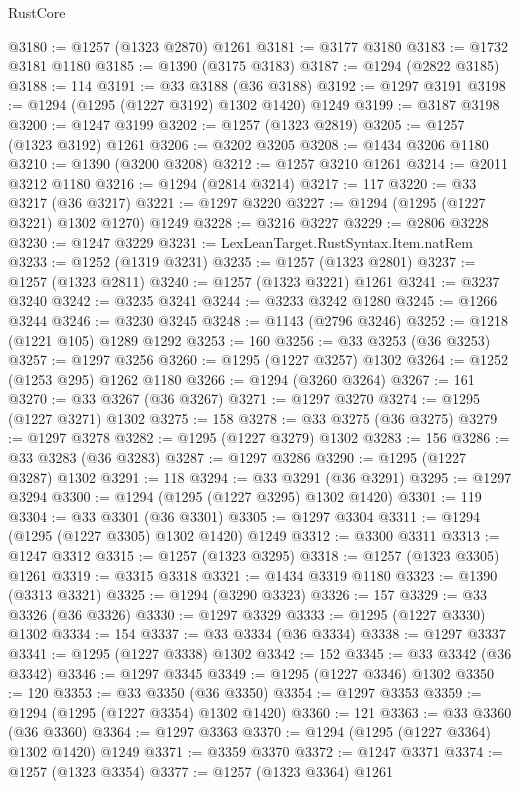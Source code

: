 \begin{lexlean}{RustCore}
\begin{coremodule}
@3180 := @1257 (@1323 @2870) @1261
@3181 := @3177 @3180
@3183 := @1732 @3181 @1180
@3185 := @1390 (@3175 @3183)
@3187 := @1294 (@2822 @3185)
@3188 := 114
@3191 := @33 @3188 (@36 @3188)
@3192 := @1297 @3191
@3198 := @1294 (@1295 (@1227 @3192) @1302 @1420) @1249
@3199 := @3187 @3198
@3200 := @1247 @3199
@3202 := @1257 (@1323 @2819)
@3205 := @1257 (@1323 @3192) @1261
@3206 := @3202 @3205
@3208 := @1434 @3206 @1180
@3210 := @1390 (@3200 @3208)
@3212 := @1257 @3210 @1261
@3214 := @2011 @3212 @1180
@3216 := @1294 (@2814 @3214)
@3217 := 117
@3220 := @33 @3217 (@36 @3217)
@3221 := @1297 @3220
@3227 := @1294 (@1295 (@1227 @3221) @1302 @1270) @1249
@3228 := @3216 @3227
@3229 := @2806 @3228
@3230 := @1247 @3229
@3231 := LexLeanTarget.RustSyntax.Item.natRem
@3233 := @1252 (@1319 @3231)
@3235 := @1257 (@1323 @2801)
@3237 := @1257 (@1323 @2811)
@3240 := @1257 (@1323 @3221) @1261
@3241 := @3237 @3240
@3242 := @3235 @3241
@3244 := @3233 @3242 @1280
@3245 := @1266 @3244
@3246 := @3230 @3245
@3248 := @1143 (@2796 @3246)
@3252 := @1218 (@1221 @105) @1289 @1292
@3253 := 160
@3256 := @33 @3253 (@36 @3253)
@3257 := @1297 @3256
@3260 := @1295 (@1227 @3257) @1302
@3264 := @1252 (@1253 @295) @1262 @1180
@3266 := @1294 (@3260 @3264)
@3267 := 161
@3270 := @33 @3267 (@36 @3267)
@3271 := @1297 @3270
@3274 := @1295 (@1227 @3271) @1302
@3275 := 158
@3278 := @33 @3275 (@36 @3275)
@3279 := @1297 @3278
@3282 := @1295 (@1227 @3279) @1302
@3283 := 156
@3286 := @33 @3283 (@36 @3283)
@3287 := @1297 @3286
@3290 := @1295 (@1227 @3287) @1302
@3291 := 118
@3294 := @33 @3291 (@36 @3291)
@3295 := @1297 @3294
@3300 := @1294 (@1295 (@1227 @3295) @1302 @1420)
@3301 := 119
@3304 := @33 @3301 (@36 @3301)
@3305 := @1297 @3304
@3311 := @1294 (@1295 (@1227 @3305) @1302 @1420) @1249
@3312 := @3300 @3311
@3313 := @1247 @3312
@3315 := @1257 (@1323 @3295)
@3318 := @1257 (@1323 @3305) @1261
@3319 := @3315 @3318
@3321 := @1434 @3319 @1180
@3323 := @1390 (@3313 @3321)
@3325 := @1294 (@3290 @3323)
@3326 := 157
@3329 := @33 @3326 (@36 @3326)
@3330 := @1297 @3329
@3333 := @1295 (@1227 @3330) @1302
@3334 := 154
@3337 := @33 @3334 (@36 @3334)
@3338 := @1297 @3337
@3341 := @1295 (@1227 @3338) @1302
@3342 := 152
@3345 := @33 @3342 (@36 @3342)
@3346 := @1297 @3345
@3349 := @1295 (@1227 @3346) @1302
@3350 := 120
@3353 := @33 @3350 (@36 @3350)
@3354 := @1297 @3353
@3359 := @1294 (@1295 (@1227 @3354) @1302 @1420)
@3360 := 121
@3363 := @33 @3360 (@36 @3360)
@3364 := @1297 @3363
@3370 := @1294 (@1295 (@1227 @3364) @1302 @1420) @1249
@3371 := @3359 @3370
@3372 := @1247 @3371
@3374 := @1257 (@1323 @3354)
@3377 := @1257 (@1323 @3364) @1261

\end{coremodule}
\end{lexlean}
